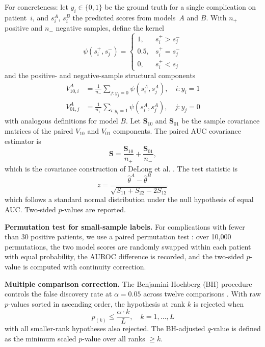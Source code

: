 \documentclass{ieeeaccess}
\begin{document}
For concreteness: let $y_i \in \{0,1\}$ be the ground truth for a single complication on patient~$i$, and $s_i^A$, $s_i^B$ the predicted scores from models~$A$ and $B$. With $n_+$ positive and $n_-$ negative samples, define the kernel
\[
\psi(s_i^{+}, s_j^{-}) =
\begin{cases}
1,   & s_i^{+} > s_j^{-} \\
0.5, & s_i^{+} = s_j^{-} \\
0,   & s_i^{+} < s_j^{-}
\end{cases}
\]
and the positive- and negative-sample structural components
\begin{align*}
V_{10,i}^{A} &= \frac{1}{n_{-}}\sum_{j: y_j=0}\psi(s_i^{A}, s_j^{A}), \quad i: y_i = 1 \\
V_{01,j}^{A} &= \frac{1}{n_{+}}\sum_{i: y_i=1}\psi(s_i^{A}, s_j^{A}), \quad j: y_j = 0
\end{align*}
with analogous definitions for model $B$. Let $\mathbf{S}_{10}$ and $\mathbf{S}_{01}$ be the sample covariance matrices of the paired $V_{10}$ and $V_{01}$ components. The paired AUC covariance estimator is
\[
\mathbf{S}=\frac{\mathbf{S}_{10}}{n_+}+\frac{\mathbf{S}_{01}}{n_-},
\]
which is the covariance construction of DeLong et al. \cite{delong1988}. The test statistic is
\[
z = \frac{\hat{\theta}^{A} - \hat{\theta}^{B}}{\sqrt{S_{11} + S_{22} - 2S_{12}}}
\]
which follows a standard normal distribution under the null hypothesis of equal AUC. Two-sided $p$-values are reported.

\textbf{Permutation test for small-sample labels.} For complications with fewer than 30 positive patients, we use a paired permutation test \cite{good2000}: over 10,000 permutations, the two model scores are randomly swapped within each patient with equal probability, the AUROC difference is recorded, and the two-sided $p$-value is computed with continuity correction.

\textbf{Multiple comparison correction.} The Benjamini-Hochberg (BH) procedure controls the false discovery rate at $\alpha = 0.05$ across twelve comparisons \cite{benjamini1995}. With raw $p$-values sorted in ascending order, the hypothesis at rank $k$ is rejected when
\[
p_{(k)} \leq \frac{\alpha \cdot k}{L}, \quad k = 1, \ldots, L
\]
with all smaller-rank hypotheses also rejected. The BH-adjusted $q$-value is defined as the minimum scaled $p$-value over all ranks $\geq k$.
\end{document}
